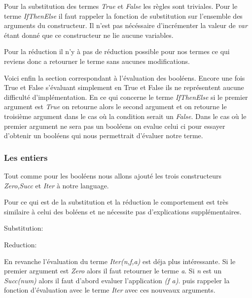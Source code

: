 \documentclass {article}
\newcommand{\codefrom}[3]
           {}
\theoremstyle{definition}
\theoremstyle{remark}
\begin{document}
\codefrom{untyped}{lambda}{bool_term}

Pour la substitution des termes \emph{True} et \emph{False} les règles 
sont triviales. Pour le terme \emph{IfThenElse} il faut rappeler la 
fonction de substitution sur l'ensemble des arguments du constructeur.
Il n'est pas nécéssaire d'incrémenter la valeur de \emph{var} étant donné
que ce constructeur ne lie aucune variables.

\codefrom{untyped}{lambda}{bool_substitution}

Pour la réduction il n'y à pas de réduction possible pour nos termes
ce qui reviens donc a retourner le terme sans aucunes modifications.


Voici enfin la section correspondant à l'évaluation des booléens.
Encore une fois True et False s'évaluant simplement en True et False ils
ne représentent aucune difficulté d'implémentation. En ce qui concerne
le terme \emph{IfThenElse} si le premier argument est \emph{True}
on retourne alors le second argument et on retourne le troisième argument 
dans le cas où la condition serait un \emph{False}. Dans le cas 
où le premier argument ne sera pas un booléens on evalue celui ci pour 
essayer d'obtenir un booléens qui nous permettrait d'évaluer notre 
terme.

\codefrom{untyped}{lambda}{bool_evaluation}


\subsubsection{Les entiers}

Tout comme pour les booléens nous allons ajouté les trois constructeurs 
\emph{Zero},\emph{Succ} et \emph{Iter} à notre language.

\codefrom{untyped}{lambda}{nat_term}

Pour ce qui est de la substitution et la réduction le comportement est très
similaire à celui des boléens et ne nécessite pas d'explications supplémentaires.

Substitution:

\codefrom{untyped}{lambda}{nat_substitution}

Reduction:

\codefrom{untyped}{lambda}{nat_reduction}

En revanche l'évaluation du terme \emph{Iter(n,f,a)} est déja plus intéressante.
Si le premier argument est \emph{Zero} alors il faut retourner le terme \emph{a}.
Si \emph{n} est un \emph{Succ(num)} alors il faut d'abord evaluer l'application 
\emph{(f a)}. puis rappeler la fonction d'évaluation avec le terme 
\emph{Iter} avec ces nouveaux arguments.
\end{document}
